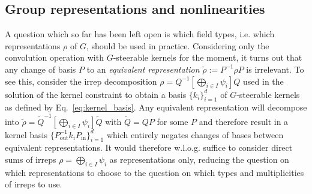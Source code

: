 \documentclass{article}
\newcommand{\apx}{Appendix\xspace
}
\renewcommand{\O}[1]{\ensuremath{\operatorname{O}(#1)}}
\newlength{\secBefore}
\newlength{\secAfter}
\newlength{\subsecBefore}
\newlength{\subsecAfter}
\begin{document}
\begin{table}[h!]
{}\vspace*{1ex}\caption{Bases for the angular parts of $\O2$-steerable kernels satisfying the irrep constraint~\eqref{eq:irrep_constraint} for different pairs of input field irreps $\psi_j$ and output field irreps $\psi_i$.The different types of irreps are explained in \apx~\ref{apx:irreps}.}\label{tab:O2_irrep_solution}\end{table}

\vspace*{-4.32ex} 	

\vspace*{\subsecBefore}
\subsection{Group representations and nonlinearities}
\label{sec:representations}
\vspace*{\subsecAfter}


A question which so far has been left open is which field types, i.e. which representations $\rho$ of $G$, should be used in practice.
Considering only the convolution operation with $G$-steerable kernels for the moment, it turns out that any change of basis $P$ to an \emph{equivalent representation} $\widetilde\rho:=P^{-1}\rho P$ is irrelevant.
To see this, consider the irrep decomposition $\rho=Q^{-1}\left[\bigoplus_{i\in I}\psi_i\right]Q$ used in the solution of the kernel constraint to obtain a basis $\{k_i\}_{i=1}^d$ of $G$-steerable kernels as defined by Eq.~\eqref{eq:kernel_basis}.
Any equivalent representation will decompose into $\widetilde{\rho}=\widetilde{Q}^{-1}\left[\bigoplus_{i\in I}\psi_i\right]\widetilde{Q}$ with $\widetilde{Q}=QP$ for some $P$ and therefore result in a kernel basis $\{P_\text{out}^{-1} k_i P_\text{in}\}_{i=1}^d$ which entirely negates changes of bases between equivalent representations.
It would therefore w.l.o.g. suffice to consider direct sums of irreps $\rho=\bigoplus_{i\in I}\psi_i$ as representations only, reducing the question on which representations to choose to the question on which types and multiplicities of irreps to use.
\end{document}
